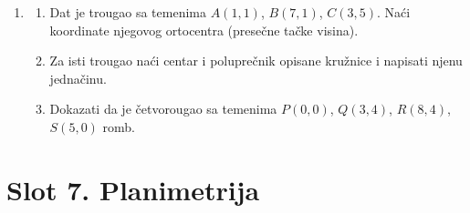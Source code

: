 \begin{enumerate}[label=\arabic*.]
\item \begin{enumerate}[label=\alph*)]
\item Dat je trougao sa temenima $A(1,1)$, $B(7,1)$, $C(3,5)$. Naći koordinate njegovog ortocentra (presečne tačke visina).
\item Za isti trougao naći centar i poluprečnik opisane kružnice i napisati njenu jednačinu.
\item Dokazati da je četvorougao sa temenima $P(0,0)$, $Q(3,4)$, $R(8,4)$, $S(5,0)$ romb.
\end{enumerate}

\end{enumerate}
\clearpage
\section*{Slot 7. Planimetrija}
